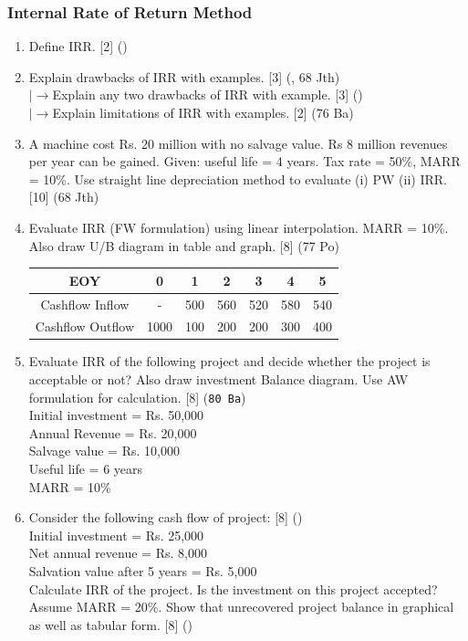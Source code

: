 \documentclass[12pt]{article}
\newcommand{\lb}{\\ $\left|\rightarrow\right.$}
\begin{document}
		\subsubsection{Internal Rate of Return Method}
			\begin{enumerate}
				\item Define IRR. \hfill [2] ()
				
				\item Explain drawbacks of IRR with examples. \hfill [3] (, 68 Jth)
				\lb  Explain any two drawbacks of IRR with example. \hfill [3] ()
				\lb  Explain limitations of IRR with examples. \hfill [2] (76 Ba)
				
				\item A machine cost Rs. 20 million with no salvage value. Rs 8 million revenues per year can be gained. Given: useful life = 4 years. Tax rate = 50\%, MARR = 10\%. Use straight line depreciation method to evaluate (i) PW (ii) IRR. \hfill [10] (68 Jth)
				
				\item Evaluate IRR (FW formulation) using linear interpolation. MARR = 10\%. Also draw U/B diagram in table and graph. \hfill [8] (77 Po)\\
				\begin{tabular}{|c|c|c|c|c|c|c|}
					\hline
					EOY & 0 & 1 & 2 & 3 & 4 & 5\\ \hline
					Cashflow Inflow & - & 500 & 560 & 520 & 580 & 540\\ \hline
					Cashflow Outflow & 1000 & 100 & 200 & 200 & 300 & 400\\ \hline
				\end{tabular}
				
				\item Evaluate IRR of the following project and decide whether the project is acceptable or not? Also draw investment Balance diagram. Use AW formulation for calculation. \hfill [8] (\texttt{80 Ba})\\
					Initial investment = Rs. 50,000\\
					Annual Revenue = Rs. 20,000\\
					Salvage value = Rs. 10,000\\
					Useful life = 6 years\\
					MARR = 10\%

				\item Consider the following cash flow of project: \hfill [8] ()\\
				Initial investment = Rs. 25,000\\
				Net annual revenue = Rs. 8,000\\
				Salvation value after 5 years = Rs. 5,000\\
				Calculate IRR of the project. Is the investment on this project accepted?\\
				Assume MARR = 20\%. Show that unrecovered project balance in graphical as well as tabular form. \hfill [8] ()


\end{enumerate}
\end{document}
